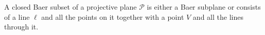 A closed Baer subset of a projective plane $\mathcal{P}$ is either a Baer subplane or consists of a line $\ell$ and all the points on it together with a point $V$ and all the lines through it.
